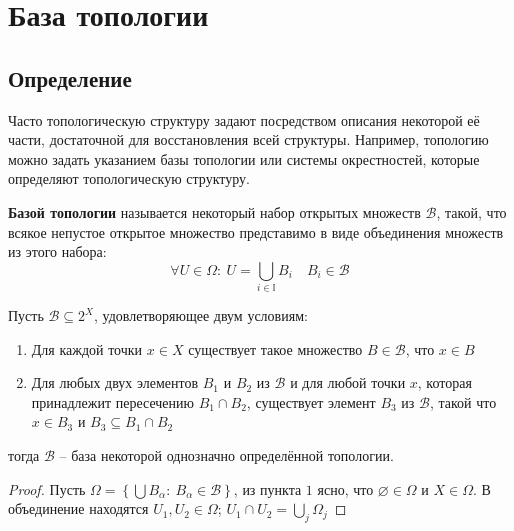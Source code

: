 \section{База топологии}
\subsection{Определение}
Часто топологическую структуру задают посредством описания некоторой её части, достаточной для восстановления всей структуры. Например, топологию можно задать указанием базы топологии или системы окрестностей, которые определяют топологическую структуру.
\begin{definition}
	\textbf{Базой топологии} называется некоторый набор открытых множеств \( \mathcal{B} \), такой, что всякое непустое открытое множество представимо в виде объединения множеств из этого набора:
	\begin{equation*}
		\forall U \in \Omega:\  U = \bigcup_{i \in \mathbb{I}} B_i \quad B_i \in \mathcal{B}
	\end{equation*}
\end{definition}

\begin{statement}
	Пусть $\mathcal{B} \subseteq 2^X$, удовлетворяющее двум условиям:
	\begin{enumerate}
		\item Для каждой точки \( x \in X \) существует такое множество \( B \in \mathcal{B} \), что \( x \in B \)
		\item Для любых двух элементов \( B_1 \) и \( B_2 \) из \( \mathcal{B} \) и для любой точки \( x \), которая принадлежит пересечению \( B_1 \cap B_2 \), существует элемент \( B_3 \) из \( \mathcal{B} \), такой что \( x \in B_3 \) и \( B_3 \subseteq B_1 \cap B_2 \)
	\end{enumerate}
	тогда $\mathcal{B}$ -- база некоторой однозначно определённой топологии.
\end{statement}

\begin{proof}
	Пусть $\Omega = \left\{\bigcup B_\alpha: \ B_\alpha \in \mathcal{B}\right\}$, из пункта $1$ ясно, что $\varnothing \in \Omega$ и $X \in \Omega$. В объединение находятся $U_1, U_2 \in \Omega$; $U_1 \cap U_2 = \bigcup_j \Omega_j$
\end{proof}

